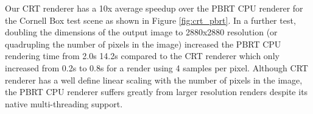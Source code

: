 \documentclass[../main.tex]{subfiles}
\begin{document}
Our CRT renderer has a 10x average speedup over the PBRT \cite{PBRT4e} CPU renderer
for the Cornell Box test scene as shown in Figure \ref{fig:crt_pbrt}.
In a further test, doubling the dimensions of the output image to
2880x2880 resolution (or quadrupling the 
number of pixels in the image) increased the PBRT CPU rendering time from 2.0s 
14.2s compared to the CRT renderer which only increased from 0.2s to 0.8s for
a render using 4 samples per pixel. Although CRT renderer has a well define linear
scaling with the number of pixels in the image, the PBRT CPU renderer suffers greatly
from larger resolution renders despite its native multi-threading support.

\ifSubfilesClassLoaded{%
    \nocite{*}
    \twocolumn
}{}
\end{document}
